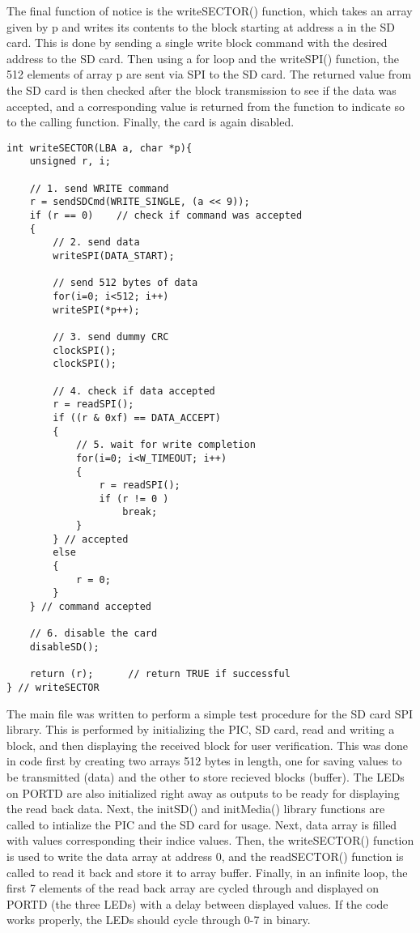 \documentclass[12pt]{article}
\begin{document}
The final function of notice is the writeSECTOR() function, which takes an array given by p and writes its contents to the block starting at address a in the SD card. This is done by sending a single write block command with the desired address to the SD card. Then using a for loop and the writeSPI() function, the 512 elements of array p are sent via SPI to the SD card. The returned value from the SD card is then checked after the block transmission to see if the data was accepted, and a corresponding value is returned from the function to indicate so to the calling function. Finally, the card is again disabled.
\begin{lstlisting}
int writeSECTOR(LBA a, char *p){
	unsigned r, i;

	// 1. send WRITE command
	r = sendSDCmd(WRITE_SINGLE, (a << 9));
	if (r == 0)    // check if command was accepted
	{  
		// 2. send data
		writeSPI(DATA_START);

		// send 512 bytes of data
		for(i=0; i<512; i++)
		writeSPI(*p++);

		// 3. send dummy CRC
		clockSPI();
		clockSPI();

		// 4. check if data accepted
		r = readSPI(); 
		if ((r & 0xf) == DATA_ACCEPT)
		{   
			// 5. wait for write completion
			for(i=0; i<W_TIMEOUT; i++)
			{ 
				r = readSPI();
				if (r != 0 )
					break;
			} 
		} // accepted
		else
		{
			r = 0;
		}
	} // command accepted

	// 6. disable the card
	disableSD();

	return (r);      // return TRUE if successful
} // writeSECTOR
\end{lstlisting}
The main file was written to perform a simple test procedure for the SD card SPI library. This is performed by initializing the PIC, SD card, read and writing a block, and then displaying the received block for user verification. This was done in code first by creating two arrays 512 bytes in length, one for saving values to be transmitted (data) and the other to store recieved blocks (buffer). The LEDs on PORTD are also initialized right away as outputs to be ready for displaying the read back data. Next, the initSD() and initMedia() library functions are called to intialize the PIC and the SD card for usage. Next, data array is filled with values corresponding their indice values. Then, the writeSECTOR() function is used to write the data array at address 0, and the readSECTOR() function is called to read it back and store it to array buffer. Finally, in an infinite loop, the first 7 elements of the read back array are cycled through and displayed on PORTD (the three LEDs) with a delay between displayed values. If the code works properly, the LEDs should cycle through 0-7 in binary.
\end{document}
